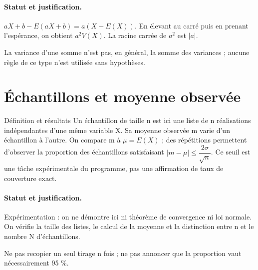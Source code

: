 \paragraph{Statut et justification.} $aX+b-E(aX+b)=a(X-E(X))$. En élevant au carré puis en prenant l’espérance, on obtient $a^2V(X)$. La racine carrée de $a^2$ est $|a|$.
\label{C08-EX4}
\begin{erreur}La variance d’une somme n’est pas, en général, la somme des variances ; aucune règle de ce type n’est utilisée sans hypothèses.\end{erreur}
\label{C08-AP4}
\section{Échantillons et moyenne observée}\label{C08-U5}
\begin{repere}{Définition et résultats}
Un échantillon de taille n est ici une liste de n réalisations indépendantes d’une même variable X. Sa moyenne observée m varie d’un échantillon à l’autre. On compare m à $\mu=E(X)$ ; des répétitions permettent d’observer la proportion des échantillons satisfaisant $|m-\mu|\leq \dfrac{2\sigma}{\sqrt n}$. Ce seuil est une tâche expérimentale du programme, pas une affirmation de taux de couverture exact.
\end{repere}
\paragraph{Statut et justification.} Expérimentation : on ne démontre ici ni théorème de convergence ni loi normale. On vérifie la taille des listes, le calcul de la moyenne et la distinction entre n et le nombre N d’échantillons.
\label{C08-EX5}
\begin{erreur}Ne pas recopier un seul tirage n fois ; ne pas annoncer que la proportion vaut nécessairement 95 \%.\end{erreur}
\label{C08-AP5}
